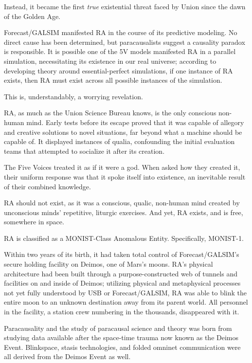 Instead, it became the first \textit{true} existential threat faced by Union since the dawn of the Golden
Age.

Forecast/GALSIM manifested RA in the course of its predictive modeling. No direct cause has
been determined, but paracausalists suggest a causality paradox is responsible. It is possible
one of the 5V models manifested RA in a parallel simulation, necessitating its existence in our
real universe; according to developing theory around essential-perfect simulations, if one
instance of RA exists, then RA must exist across all possible instances of the simulation.

This is, understandably, a worrying revelation.

RA, as much as the Union Science Bureau knows, is the only conscious non-human mind. Early
tests before its escape proved that it was capable of allegory and creative solutions to novel
situations, far beyond what a machine should be capable of. It displayed instances of qualia,
confounding the initial evaluation teams that attempted to socialize it after its creation.

The Five Voices treated it as if it were a god. When asked how they created it, their uniform
response was that it spoke itself into existence, an inevitable result of their combined knowledge.

RA should not exist, as it was a conscious, qualic, non-human mind created by unconscious
minds' repetitive, liturgic exercises. And yet, RA exists, and is free, somewhere in space.

RA is classified as a MONIST-Class Anomalous Entity. Specifically, MONIST-1.

Within two years of its birth, it had taken total control of Forecast/GALSIM's secure holding
facility on Deimos, one of Mars's moons. RA's physical architecture had been built through a
purpose-constructed web of tunnels and facilities on and inside of Deimos; utilizing physical and
metaphysical processes not yet fully understood by USB or Forecast/GALSIM, RA was able to
blink the entire moon to an unknown destination away from its parent world. All personnel in the
facility, a station crew numbering in the thousands, disappeared with it.

Paracausality and the study of paracausal science and theory was born from studying data
available after the space-time trauma now known as the Deimos Event. Blinkspace, stasis
technologies, and folded omninet communication were all derived from the Deimos Event as
well.

